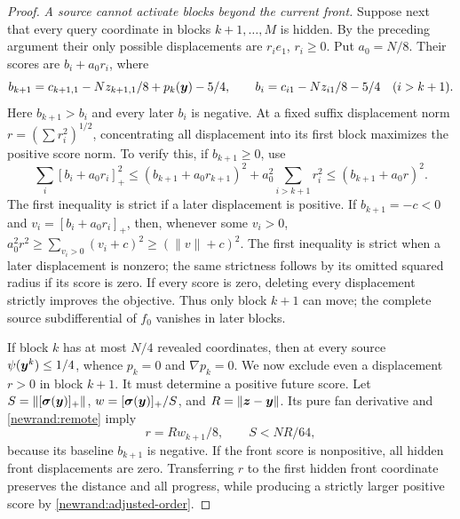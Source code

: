 {\begin{proof}
\emph{A source cannot activate blocks beyond the current front.}
Suppose next that every query coordinate in blocks $k+1,\ldots,M$
is hidden.  By the preceding argument their only possible
displacements are $r_i e_1$, $r_i\ge0$.  Put $a_0=N/8$.
Their scores are $b_i+a_0r_i$, where
\[
 b_{k+1}=c_{k+1,1}-Nz_{k+1,1}/8+p_k(\bm{y})-5/4,
 \qquad b_i=c_{i1}-Nz_{i1}/8-5/4\quad(i>k+1).
\]
Here $b_{k+1}>b_i$ and every later $b_i$ is negative.  At a fixed
suffix displacement norm $r=(\sum r_i^2)^{1/2}$, concentrating all
displacement into its first block maximizes the positive score norm.
To verify this, if $b_{k+1}\ge0$, use
\[
 \sum_i[b_i+a_0r_i]_+^2
 \le(b_{k+1}+a_0r_{k+1})^2+a_0^2\sum_{i>k+1}r_i^2
 \le(b_{k+1}+a_0r)^2.
\]
The first inequality is strict if a later displacement is positive.
If $b_{k+1}=-c<0$ and $v_i=[b_i+a_0r_i]_+$, then, whenever
some $v_i>0$,
$a_0^2r^2\ge\sum_{v_i>0}(v_i+c)^2\ge(\|v\|+c)^2$.
The first inequality is strict when a later displacement is nonzero;
the same strictness follows by its omitted squared radius if its
score is zero.  If every score is zero, deleting every displacement
strictly improves the objective.  Thus only block $k+1$ can move;
the complete source subdifferential of $f_0$ vanishes in later blocks.

If block $k$ has at most $N/4$ revealed coordinates, then at every
source $\psi(\bm{y}^k)\le1/4$, whence $p_k=0$ and $\nabla p_k=0$.
We now exclude even a displacement $r>0$ in block $k+1$.
It must determine a positive future score.  Let
$S=\|[\boldsymbol\sigma(\bm{y})]_+\|$, $w=[\boldsymbol\sigma(\bm{y})]_+/S$,
and $R=\|\bm{z}-\bm{y}\|$.  Its pure fan derivative and
\eqref{newrand:remote} imply
\begin{equation}
 r=Rw_{k+1}/8,
 \qquad S<NR/64,
 \label{newrand:front-curvature}
\end{equation}
because its baseline $b_{k+1}$ is negative.
If the front score is nonpositive, all hidden front displacements
are zero.  Transferring $r$ to the first hidden front coordinate
preserves the distance and all progress, while producing a strictly
larger positive score by \eqref{newrand:adjusted-order}.


\end{proof}}
